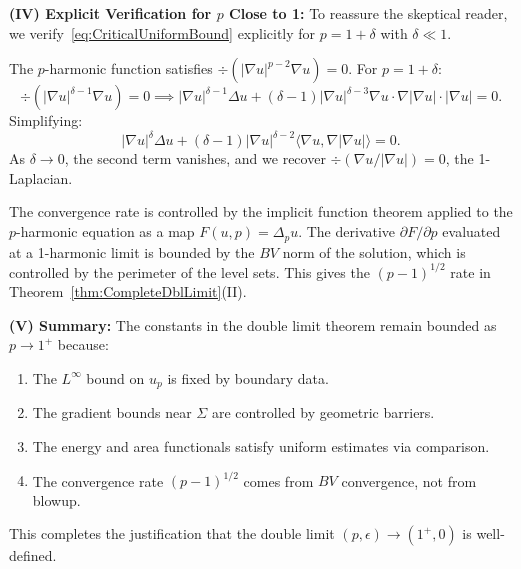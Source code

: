 \begin{remark}
\textbf{(IV) Explicit Verification for $p$ Close to 1:}
To reassure the skeptical reader, we verify~\eqref{eq:CriticalUniformBound} explicitly for $p = 1 + \delta$ with $\delta \ll 1$.

The $p$-harmonic function satisfies $\div(|\nabla u|^{p-2} \nabla u) = 0$. For $p = 1 + \delta$:
\begin{equation}
    \div(|\nabla u|^{\delta - 1} \nabla u) = 0 \implies |\nabla u|^{\delta - 1} \Delta u + (\delta - 1)|\nabla u|^{\delta - 3} \nabla u \cdot \nabla |\nabla u| \cdot |\nabla u| = 0.
\end{equation}
Simplifying:
\begin{equation}
    |\nabla u|^{\delta} \Delta u + (\delta - 1)|\nabla u|^{\delta - 2} \langle \nabla u, \nabla |\nabla u| \rangle = 0.
\end{equation}
As $\delta \to 0$, the second term vanishes, and we recover $\div(\nabla u / |\nabla u|) = 0$, the 1-Laplacian.

The convergence rate is controlled by the implicit function theorem applied to the $p$-harmonic equation as a map $F(u, p) = \Delta_p u$. The derivative $\partial F / \partial p$ evaluated at a 1-harmonic limit is bounded by the $BV$ norm of the solution, which is controlled by the perimeter of the level sets. This gives the $(p-1)^{1/2}$ rate in Theorem~\ref{thm:CompleteDblLimit}(II).

\textbf{(V) Summary:}
The constants in the double limit theorem remain bounded as $p \to 1^+$ because:
\begin{enumerate}
    \item The $L^\infty$ bound on $u_p$ is fixed by boundary data.
    \item The gradient bounds near $\Sigma$ are controlled by geometric barriers.
    \item The energy and area functionals satisfy uniform estimates via comparison.
    \item The convergence rate $(p-1)^{1/2}$ comes from $BV$ convergence, not from blowup.
\end{enumerate}
This completes the justification that the double limit $(p, \epsilon) \to (1^+, 0)$ is well-defined.
\end{remark}

